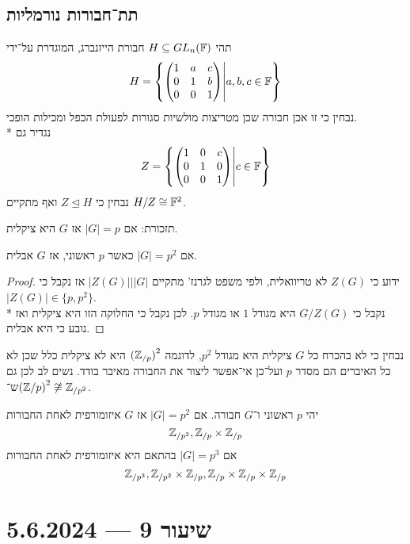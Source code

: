 \subsection{תת־חבורות נורמליות}
\begin{example}
	תהי $H \subseteq GL_n(\mathbb{F})$ חבורת הייזנברג, המוגדרת על־ידי
	\[
		H = \left\{
			\begin{pmatrix}
				1 & a & c \\
				0 & 1 & b \\
				0 & 0 & 1
			\end{pmatrix}
			\middle|
			a, b, c \in \mathbb{F}
		\right\}
	\]
	נבחין כי זו אכן חבורה שכן מטריצות מולשיות סגורות לפעולת הכפל ומכילות הופכי. \\*
	נגדיר גם
	\[
		Z = \left\{
			\begin{pmatrix}
				1 & 0 & c \\
				0 & 1 & 0 \\
				0 & 0 & 1
			\end{pmatrix}
			\middle|
			c \in \mathbb{F}
		\right\}
	\]
	נבחין כי $Z \trianglelefteq H$ ואף מתקיים $H/Z \cong \mathbb{F}^2$.
\end{example}
\begin{lemma}
	תזכורת: אם $|G| = p$ אז $G$ היא ציקלית.
\end{lemma}
\begin{lemma}
	אם $|G| = p^2$ כאשר $p$ ראשוני, אז $G$ אבלית.
\end{lemma}
\begin{proof}
	ידוע כי $Z(G)$ לא טריוואלית, ולפי משפט לגרנז' מתקיים $|Z(G)| \Big| |G|$ אז נקבל כי $|Z(G)| \in \{ p, p^2 \}$. \\*
	נקבל כי $G/Z(G)$ היא מגודל $1$ או מגודל $p$. לכן נקבל כי החלוקה הזו היא ציקלית ואז נובע כי היא אבלית.
\end{proof}
נבחין כי לא בהכרח כל $G$ ציקלית היא מגודל $p^2$, לדוגמה ${(\mathbb{Z}_{/p})}^2$ היא לא ציקלית כלל שכן לא כל האיברים הם מסדר $p$ ועל־כן אי־אפשר ליצור את החבורה מאיבר בודד. נשים לב לכן גם ש־${(\mathbb{Z}/p)}^2 \not\cong \mathbb{Z}_{/p^2}$.
\begin{proposition}
	יהי $p$ ראשוני ו־$G$ חבורה. אם $|G| = p^2$ אז $G$ איזומורפית לאחת החבורות
	\[
		\mathbb{Z}_{/p^2}, \mathbb{Z}_{/p} \times \mathbb{Z}_{/p}
	\]
	אם $|G| = p^3$ בהתאם היא איזומורפית לאחת החבורות
	\[
		\mathbb{Z}_{/p^3}, \mathbb{Z}_{/p^2} \times \mathbb{Z}_{/p}, \mathbb{Z}_{/p} \times \mathbb{Z}_{/p} \times \mathbb{Z}_{/p}
	\]
\end{proposition}

\section{שיעור 9 --- 5.6.2024}

